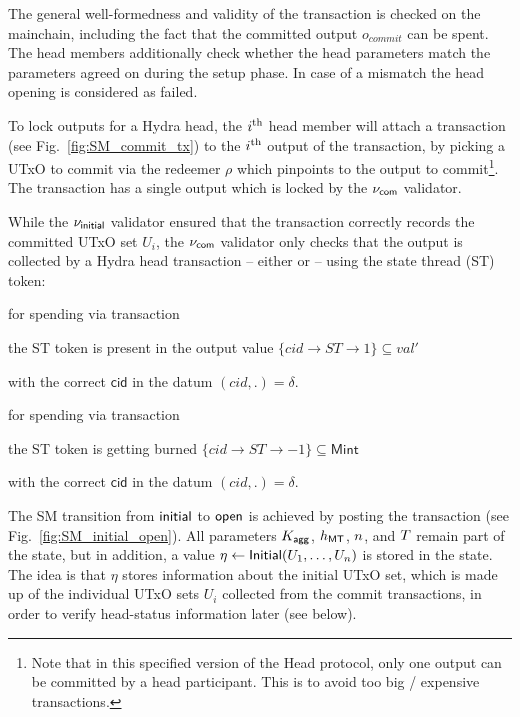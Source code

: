 The general well-formedness and validity of the \mtxInit{} transaction is
checked on the mainchain, including the fact that the committed output
$o_{commit}$ can be spent. The head members additionally check whether the head
parameters match the parameters agreed on during the setup phase. In case of a
mismatch the head opening is considered as failed.

 To lock outputs for a Hydra head, the
$i^{\text{th}}$ head member will attach a \mtxCom{} transaction (see
Fig.~\ref{fig:SM_commit_tx}) to the $i^{\text{th}}$ output of the \mtxInit{}
transaction, by picking a UTxO to commit via the redeemer $\rho$ which pinpoints
to the output to commit\footnote{Note that in this specified version of the Head
  protocol, only one output can be committed by a head participant. This is to
  avoid too big / expensive \mtxCollect{} transactions.}. The \mtxCom{}
transaction has a single output which is locked by the $\nu_\mathsf{com}$ validator.

While the $\nu_\mathsf{initial}$ validator ensured that the \mtxCommit{} transaction
correctly records the committed UTxO set $U_i$, the $\nu_\mathsf{com}$ validator only
checks that the output is collected by a Hydra head transaction -- either
\mtxCCom{} or \mtxAbort{} -- using the state thread (ST) token:

\begin{menumerate}
  \item for spending via \mtxCom{} transaction
    \begin{menumerate}
      \item the ST token is present in the output value $\{cid \rightarrow ST \rightarrow 1\} \subseteq val'$
      \item with the correct $\mathsf{cid}$ in the datum $(cid,.) = \delta$.
    \end{menumerate}
  \item for spending via \mtxAbort{} transaction
    \begin{menumerate}
      \item the ST token is getting burned $\{cid \rightarrow ST \rightarrow -1\} \subseteq \mathsf{Mint}$
      \item with the correct $\mathsf{cid}$ in the datum $(cid,.) = \delta$.
    \end{menumerate}
\end{menumerate}



 The SM transition from $\mathsf{initial}$
to $\mathsf{open}$ is achieved by posting the \mtxCCom{} transaction (see
Fig.~\ref{fig:SM_initial_open}).  All parameters $K_{\mathsf{agg}}$, $h_{\mathsf{MT}}$,
$n$, and $T$ remain part of the state, but in addition, a value
$\eta \gets \mathsf{Initial}(U_1,\ldots,U_n)$ is stored in the state.
The idea is that $\eta$ stores information about the initial UTxO set,
which is made up of the individual UTxO sets $U_i$ collected from the
commit transactions, in order to verify head-status information later
(see below).

